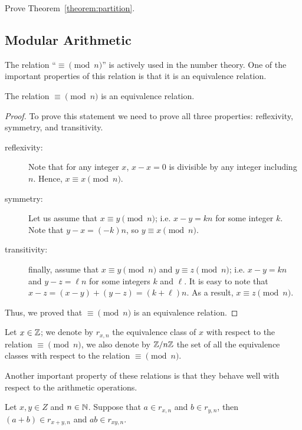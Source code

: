 \begin{exercise}
  Prove Theorem~\ref{theorem:partition}.
\end{exercise}

\subsection{Modular Arithmetic}
The relation ``$\equiv \pmod{n}$'' is actively used in the number theory. One
of the important properties of this relation is that it is an equivalence
relation.
\begin{theorem}
  The relation $\equiv \pmod{n}$ is an equivalence relation.
\end{theorem}
\begin{proof}
  To prove this statement we need to prove all three properties: reflexivity,
  symmetry, and transitivity.
  \begin{description}
    \item[reflexivity:] Note that for any integer $x$, $x - x = 0$ is divisible
      by any integer including $n$. Hence, $x \equiv x \pmod{n}$.
    \item[symmetry:] Let us assume that $x \equiv y \pmod{n}$; i.e. $x - y = kn$
      for some integer $k$. Note that $y - x = (-k) n$, so
      $y \equiv x \pmod{n}$.
    \item[transitivity:] finally, assume that $x \equiv y \pmod{n}$ and
      $y \equiv z \pmod{n}$; i.e. $x - y = k n$ and $y - z = \ell n$
      for some integers $k$ and $\ell$. It is easy to note that
      $x - z = (x - y) + (y - z) = (k + \ell) n$. As a result,
      $x \equiv z \pmod{n}$.
  \end{description}
  Thus, we proved that $\equiv \pmod{n}$ is an equivalence relation.
\end{proof}

Let $x \in \mathbb{Z}$; we denote by $r_{x, n}$ the equivalence class of $x$ with
respect to the relation $\equiv \pmod{n}$, we also denote by $\mathbb{Z} / n\mathbb{Z}$ the set
of all the equivalence classes with respect to the relation $\equiv \pmod{n}$.

Another important property of these relations is that they behave well with
respect to the arithmetic operations.
\begin{theorem}
  Let $x, y \in Z$ and $n \in \mathbb{N}$. Suppose that $a \in r_{x, n}$ and $b \in
  r_{y, n}$, then $(a + b) \in r_{x + y, n}$ and $ab \in r_{xy, n}$.
\end{theorem}


